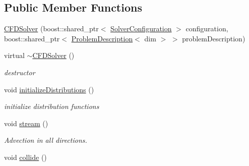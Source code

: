 \subsection*{Public Member Functions}
\begin{DoxyCompactItemize}
\item 
\hyperlink{classnatrium_1_1CFDSolver_a47ca594a73dc5ab04e319ba588cda3dd}{CFDSolver} (boost::shared\_\-ptr$<$ \hyperlink{classnatrium_1_1SolverConfiguration}{SolverConfiguration} $>$ configuration, boost::shared\_\-ptr$<$ \hyperlink{classnatrium_1_1ProblemDescription}{ProblemDescription}$<$ dim $>$ $>$ problemDescription)
\item 
\hypertarget{classnatrium_1_1CFDSolver_a7ca9bd709255ac87b34f869c984b913b}{
virtual \hyperlink{classnatrium_1_1CFDSolver_a7ca9bd709255ac87b34f869c984b913b}{$\sim$CFDSolver} ()}
\label{classnatrium_1_1CFDSolver_a7ca9bd709255ac87b34f869c984b913b}

\begin{DoxyCompactList}\small\item\em destructor \item\end{DoxyCompactList}\item 
\hypertarget{classnatrium_1_1CFDSolver_a55f59127a21da7d4c595335aab97c717}{
void \hyperlink{classnatrium_1_1CFDSolver_a55f59127a21da7d4c595335aab97c717}{initializeDistributions} ()}
\label{classnatrium_1_1CFDSolver_a55f59127a21da7d4c595335aab97c717}

\begin{DoxyCompactList}\small\item\em initialize distribution functions \item\end{DoxyCompactList}\item 
\hypertarget{classnatrium_1_1CFDSolver_ab2851a7e3244689b7a1bf9cda3759b55}{
void \hyperlink{classnatrium_1_1CFDSolver_ab2851a7e3244689b7a1bf9cda3759b55}{stream} ()}
\label{classnatrium_1_1CFDSolver_ab2851a7e3244689b7a1bf9cda3759b55}

\begin{DoxyCompactList}\small\item\em Advection in all directions. \item\end{DoxyCompactList}\item 
\hypertarget{classnatrium_1_1CFDSolver_a0eccad07388eccf53d7cfeb3dd818657}{
void \hyperlink{classnatrium_1_1CFDSolver_a0eccad07388eccf53d7cfeb3dd818657}{collide} ()}
\label{classnatrium_1_1CFDSolver_a0eccad07388eccf53d7cfeb3dd818657}


\end{DoxyCompactItemize}
